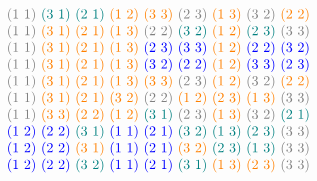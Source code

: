 \begin{xmpl}
$$\begin{tabular}{c}
		\textcolor{gray}{(1 1)} \textcolor{teal}{(3 1)} \textcolor{teal}{(2 1)} \textcolor{orange}{(1 2)} \textcolor{orange}{(3 3)} \textcolor{gray}{(2 3)} \textcolor{orange}{(1 3)} \textcolor{gray}{(3 2)} \textcolor{orange}{(2 2)}\\
		\textcolor{gray}{(1 1)} \textcolor{orange}{(3 1)} \textcolor{orange}{(2 1)} \textcolor{orange}{(1 3)} \textcolor{gray}{(2 2)} \textcolor{teal}{(3 2)} \textcolor{orange}{(1 2)} \textcolor{teal}{(2 3)} \textcolor{gray}{(3 3)}\\
		\textcolor{gray}{(1 1)} \textcolor{orange}{(3 1)} \textcolor{orange}{(2 1)} \textcolor{orange}{(1 3)} \textcolor{blue}{(2 3)} \textcolor{blue}{(3 3)} \textcolor{orange}{(1 2)} \textcolor{blue}{(2 2)} \textcolor{blue}{(3 2)}\\
		\textcolor{gray}{(1 1)} \textcolor{orange}{(3 1)} \textcolor{orange}{(2 1)} \textcolor{orange}{(1 3)} \textcolor{blue}{(3 2)} \textcolor{blue}{(2 2)} \textcolor{orange}{(1 2)} \textcolor{blue}{(3 3)} \textcolor{blue}{(2 3)}\\
		\textcolor{gray}{(1 1)} \textcolor{orange}{(3 1)} \textcolor{orange}{(2 1)} \textcolor{orange}{(1 3)} \textcolor{orange}{(3 3)} \textcolor{gray}{(2 3)} \textcolor{orange}{(1 2)} \textcolor{gray}{(3 2)} \textcolor{orange}{(2 2)}\\
		\textcolor{gray}{(1 1)} \textcolor{orange}{(3 1)} \textcolor{orange}{(2 1)} \textcolor{orange}{(3 2)} \textcolor{gray}{(2 2)} \textcolor{orange}{(1 2)} \textcolor{orange}{(2 3)} \textcolor{orange}{(1 3)} \textcolor{gray}{(3 3)}\\
		\textcolor{gray}{(1 1)} \textcolor{orange}{(3 3)} \textcolor{orange}{(2 2)} \textcolor{orange}{(1 2)} \textcolor{teal}{(3 1)} \textcolor{gray}{(2 3)} \textcolor{orange}{(1 3)} \textcolor{gray}{(3 2)} \textcolor{teal}{(2 1)}\\
		\textcolor{blue}{(1 2)} \textcolor{blue}{(2 2)} \textcolor{teal}{(3 1)} \textcolor{blue}{(1 1)} \textcolor{blue}{(2 1)} \textcolor{teal}{(3 2)} \textcolor{teal}{(1 3)} \textcolor{teal}{(2 3)} \textcolor{gray}{(3 3)}\\
		\textcolor{blue}{(1 2)} \textcolor{blue}{(2 2)} \textcolor{orange}{(3 1)} \textcolor{blue}{(1 1)} \textcolor{blue}{(2 1)} \textcolor{orange}{(3 2)} \textcolor{teal}{(2 3)} \textcolor{teal}{(1 3)} \textcolor{gray}{(3 3)}\\
		\textcolor{blue}{(1 2)} \textcolor{blue}{(2 2)} \textcolor{teal}{(3 2)} \textcolor{blue}{(1 1)} \textcolor{blue}{(2 1)} \textcolor{teal}{(3 1)} \textcolor{orange}{(1 3)} \textcolor{orange}{(2 3)} \textcolor{gray}{(3 3)}\\

\end{tabular}$$
\end{xmpl}
